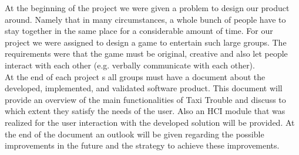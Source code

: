 At the beginning of the project we were given a problem to design our product around. Namely that in many circumstances, a whole bunch of people have to stay together in the same place for a considerable amount of time. For our project we were assigned to design a game to entertain such large groups. The requirements were that the game must be original, creative  and also let people interact with each other (e.g.  verbally communicate with each other). \\
At the end of each project s all groups must have a document about the developed, implemented, and validated software product. This document will provide an overview of the main functionalities of Taxi Trouble and discuss to which extent they satisfy the needs of the user. Also an HCI module that was realized for the user interaction with the developed solution will be provided. At the end of the document an outlook will be given  regarding  the possible improvements in the future and the strategy to achieve these improvements.
